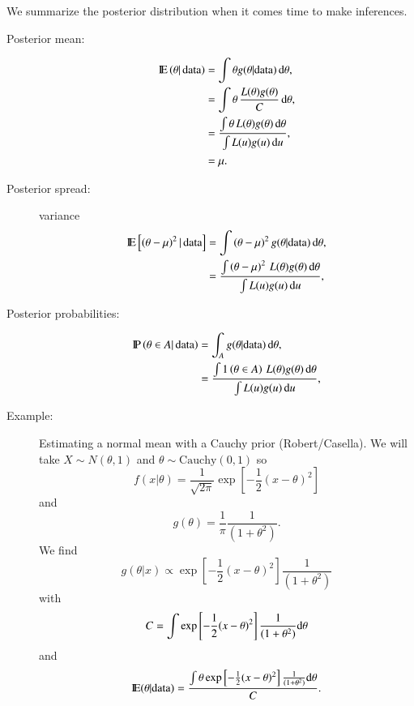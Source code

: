 \documentclass[11pt,english]{scrbook}
\begin{document}
We summarize the posterior distribution when it comes time to make inferences.
\begin{description}
\item[{Posterior mean:}] \begin{align*}
\mathrm{I\hspace{-1.5pt}E} \left( \theta |\, \mbox{data}  \right) & = \int \theta g( \theta | \mbox{data} ) \, \mathrm{d} \theta, \\
& = \int \theta \, \frac{L(\theta)g(\theta)}{C} \, \mathrm{d} \theta, \\
& = \frac{\int \theta \, L(\theta)g(\theta) \, \mathrm{d} \theta}{\int L(u)g(u) \, \mathrm{d} u}, \\
& = \mu.
\end{align*}
\item[{Posterior spread:}] variance
\begin{align*}
\mathrm{I\hspace{-1.5pt}E} \left[ \left(\theta - \mu \right)^{2} |\, \mbox{data}  \right] & = \int \left(\theta - \mu \right)^{2} g( \theta | \mbox{data} ) \, \mathrm{d} \theta, \\
& = \frac{\int \left(\theta - \mu \right)^{2} \, L(\theta)g(\theta) \, \mathrm{d} \theta}{\int L(u)g(u) \, \mathrm{d} u}, \\
\end{align*}
\item[{Posterior probabilities:}] \begin{align*}
\mathrm{I\hspace{-1.5pt}P}\left( \theta \in A |\,\mbox{data} \right) & = \int_{A}  g( \theta | \mbox{data} ) \, \mathrm{d} \theta, \\
& = \frac{\int 1\left(\theta \in A \right) \, L(\theta)g(\theta) \, \mathrm{d} \theta}{\int L(u)g(u) \, \mathrm{d} u}, \\
\end{align*}
\end{description}



\begin{description}
\item[{Example:}] Estimating a normal mean with a Cauchy prior (Robert/Casella).
We will take \(X \sim N(\theta,1)\)  and \(\theta \sim \mathrm{Cauchy}(0,1)\) so 
\[
  f(x|\theta) = \frac{1}{\sqrt{2\pi}}\exp \left[-\frac{1}{2}(x - \theta)^2  \right]
  \]
and
\[
  g(\theta) = \frac{1}{\pi}\frac{1}{(1 + \theta^{2})}.
  \]
We find
\[
  g(\theta|x) \propto \exp \left[-\frac{1}{2}(x - \theta)^2  \right] \frac{1}{(1 + \theta^{2})}
  \]
with
\[
  C = \int \exp \left[-\frac{1}{2}(x - \theta)^2  \right] \frac{1}{(1 + \theta^{2})} \mathrm{d} \theta
  \]
and
\[
  \mathrm{I\hspace{-1.5pt}E} (\theta | \mbox{data}) = \frac{ \int \theta \exp \left[-\frac{1}{2}(x - \theta)^2  \right] \frac{1}{(1 + \theta^{2})} \mathrm{d} \theta }{C}.
  \]
\end{description}
\end{document}
